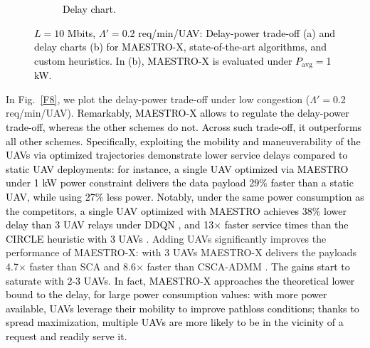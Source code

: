 \documentclass[12pt, draftcls, onecolumn]{IEEEtran}
\theoremstyle{plain}
\theoremstyle{definition}
\theoremstyle{remark}
\newcommand\hlt[1]{\textcolor{black}{#1}}
\begin{document}
\begin{figure} [t]
\begin{subfigure}{0.433\linewidth}
         \caption{\hlt{Delay chart.}}
         \label{F9}
     \end{subfigure}
     \vspace{-2mm}
     \caption{\hlt{$L{=}10$ Mbits, $\Lambda'{=}$0.2 req/min/UAV: Delay-power trade-off (a) and delay charts (b) for MAESTRO-X, state-of-the-art algorithms, and custom heuristics. In (b), MAESTRO-X is evaluated under $P_{\mathrm{avg}}=$1 kW.}}
     \label{F8F9}
\end{figure}

In Fig.~\ref{F8}, we plot the delay-power trade-off under low congestion ($\Lambda'{=}$0.2 req/min/UAV).
\hlt{Remarkably, MAESTRO-X allows to regulate the delay-power trade-off, whereas the other schemes do not.
Across such trade-off, it outperforms all other schemes.}
\hlt{Specifically,
exploiting the mobility and maneuverability of the UAVs via optimized trajectories demonstrate lower service delays compared to static UAV deployments: for instance, a single UAV optimized via MAESTRO under 1 kW power constraint delivers the data payload 29\% faster than a static UAV, while using 27\% less power. 
Notably, under the same power consumption as the competitors, a single UAV optimized with MAESTRO achieves 38\% lower delay than 3 UAV relays  under DDQN \cite{DDQN}, and 13$\times$ faster service times than the CIRCLE heuristic with 3 UAVs \cite{MEC-DDPG}}. 
Adding UAVs significantly improves the performance of MAESTRO-X: with 3 UAVs MAESTRO-X delivers the payloads 4.7${\times}$ faster than SCA \cite{SCA} and 8.6$\times$ faster than CSCA-ADMM \cite{CSCA-ADMM}.
\hlt{The  gains start to saturate with 2-3 UAVs. In fact,
MAESTRO-X approaches the theoretical lower bound to the delay, for large power consumption values:
with more power available, UAVs leverage their mobility to improve pathloss conditions;
 thanks to spread maximization, multiple UAVs are more likely to be in the vicinity of a request and readily serve it.}
\end{document}
